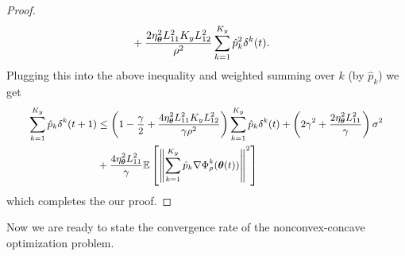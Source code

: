 \begin{proof}
\begin{equation}
\begin{aligned}
			& + \frac{2\eta_{\text{\boldmath{$\theta$}}}^{2}L_{11}^{2}K_{y}L_{12}^{2}}{\rho^{2}}\sum\limits_{k=1}^{K_{y}}\hat{p}_{k}^{2}\delta^{k}(t).
		\end{aligned}
	\end{equation}
	Plugging this into the above inequality and weighted summing over $k$ (by $\hat{p}_{k}$) we get 
	\begin{equation}
		\small
		\begin{aligned}
			\sum\limits_{k=1}^{K_{y}}\hat{p}_{k}\delta^{k}(t + 1) & \leq \left(1 - \frac{\gamma}{2} + \frac{4\eta_{\btheta}^{2}L_{11}^{2}K_{y}L_{12}^{2}}{\gamma\rho^{2}}\right)\sum\limits_{k=1}^{K_{y}}\hat{p}_{k}\delta^{k}(t) + \left(2\gamma^{2} + \frac{2\eta_{\btheta}^{2}L_{11}^{2}}{\gamma}\right)\sigma^{2} \\
			& + \frac{4\eta_{\btheta}^{2}L_{11}^{2}}{\gamma}\mE\left[\left\|\sum\limits_{k = 1}^{K_{y}}\hat{p}_{k}\nabla\Phi_{\rho}^{k}(\btheta(t))\right\|^{2}\right]
		\end{aligned}
	\end{equation}
	which completes the our proof. 
\end{proof}
\par
Now we are ready to state the convergence rate of the nonconvex-concave optimization problem. 
\convergencerate*
